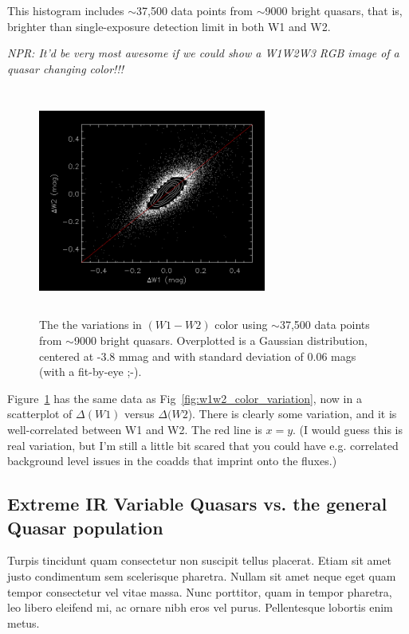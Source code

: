 \documentclass{emulateapj}
\begin{document}
This histogram includes $\sim$37,500 data points from $\sim$9000
bright quasars, that is, brighter than single-exposure detection limit in both
W1 and W2. 

    {\it NPR: It'd be very most awesome if we could show a
      W1W2W3 RGB image of a quasar changing color!!!}

    \begin{figure}
      \includegraphics[width=7.50cm, height=7.50cm, 
      trim=0.0cm 0.0cm 0.0cm 0.0cm, clip]
      {scatter_dW1_dW2.png}
      \centering
      \caption[]{The the variations in $(W1-W2)$ color using
        $\sim$37,500 data points from $\sim$9000 bright quasars. Overplotted
        is a Gaussian distribution, centered at -3.8 mmag and with standard
        deviation of 0.06 mags (with a fit-by-eye ;-).}
      \label{fig:scatter_dW1_dW2}
    \end{figure}
    Figure~\ref{fig:scatter_dW1_dW2} has the same data as
    Fig~\ref{fig:w1w2_color_variation}, now in a scatterplot of
    $\Delta(W1)$ versus $\Delta(W2$). There is clearly some variation, and
    it is well-correlated between W1 and W2. The red line is $x=y$. 
    (I would guess this is real variation, but I'm still a little bit scared that
    you could have e.g. correlated background level issues in the coadds
    that imprint onto the fluxes.)

    \subsection{Extreme IR Variable Quasars vs. the general Quasar population}
    Turpis tincidunt quam consectetur non suscipit tellus placerat. Etiam
    sit amet justo condimentum sem scelerisque pharetra. Nullam sit amet
    neque eget quam tempor consectetur vel vitae massa. Nunc porttitor,
    quam in tempor pharetra, leo libero eleifend mi, ac ornare nibh eros
    vel purus. Pellentesque lobortis enim metus.
\end{document}
